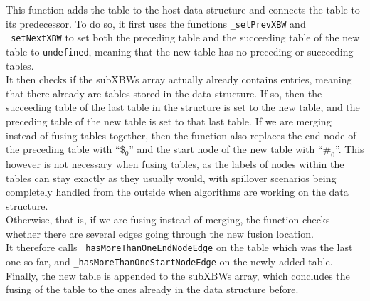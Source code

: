 \documentclass[a4paper,12pt,twoside,BCOR=10mm]{scrbook}
\begin{document}
This function adds the table to the host data structure and connects the table to its predecessor. 
To do so, it first uses the functions \texttt{\_setPrevXBW} and \texttt{\_setNextXBW} to 
set both the preceding table and the succeeding table 
of the new table to \texttt{undefined}, meaning that the new table 
has no preceding or succeeding tables. \\
It then checks if the subXBWs array actually already contains entries, meaning that there 
already are tables stored in the data structure. 
If so, then the succeeding table of the last table in the structure is set to the new table, 
and the preceding table of the new table is set to that last table. 
If we are merging instead of fusing tables together, then the function also 
replaces the end node of the preceding table with “$\$_0$” and the start node 
of the new table with “$\#_0$”. 
This however is not necessary when fusing tables, as the labels of nodes within the 
tables can stay exactly as they usually would, with spillover scenarios being 
completely handled from the outside when algorithms are working on the data structure. \\
Otherwise, that is, if we are fusing instead of merging, the function checks 
whether there are several edges going through the new fusion location. \\
It therefore calls \texttt{\_hasMoreThanOneEndNodeEdge} on the table which was the last one so far, 
and \texttt{\_hasMoreThanOneStartNodeEdge} on the newly added table. \\
Finally, the new table is appended to the subXBWs array, which concludes the fusing of the 
table to the ones already in the data structure before.
\end{document}
